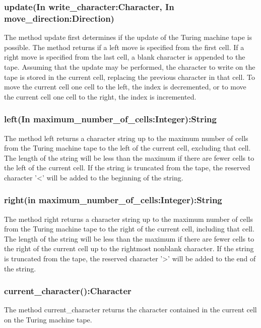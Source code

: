 \documentclass{report}
\begin{document}
    \subsubsection{update(In write\_character:Character, In move\_direction:Direction)}
    The method update first determines if the update of the Turing machine tape is possible. The method returns if a left move is specified from the first cell. If a right move is specified from the last cell, a blank character is appended to the tape. Assuming that the update may be performed, the character to write on the tape is stored in the current cell, replacing the previous character in that cell. To move the current cell one cell to the left, the index is decremented, or to move the current cell one cell to the right, the index is incremented. 
    
    \subsubsection{left(In maximum\_number\_of\_cells:Integer):String}
    
    The method left returns a character string up to the maximum number of cells from the Turing machine tape to the left of the current cell, excluding that cell. The length of the string will be less than the maximum if there are fewer cells to the left of the current cell. If the string is truncated from the tape, the reserved character '<' will be added to the beginning of the string.
    
    \subsubsection{right(in maximum\_number\_of\_cells:Integer):String }
    The method right returns a character string up to the maximum number of cells from the Turing machine tape to the right of the current cell, including that cell. The length of the string will be less than the maximum if there are fewer cells to the right of the current cell up to the rightmost nonblank character. If the string is truncated from the tape, the reserved character '>' will be added to the end of the string.
    
    \subsubsection{ current\_character():Character}
    
    The method current\_character returns the character contained in the current cell on the Turing machine tape.
    
\end{document}
